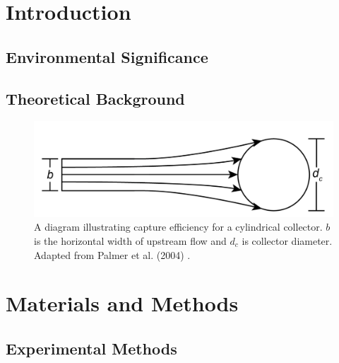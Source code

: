 \documentclass[geosciences,article,submit,moreauthors,pdftex]{Definitions/mdpi}
\begin{document}
\section{Introduction}

\subsection{Environmental Significance}

\subsection{Theoretical Background}

\begin{figure}[H]
\includegraphics[width=5in]{../pics/collectorefficiency.png}
\centering
\caption{A diagram illustrating capture efficiency for a cylindrical collector. $b$ is the horizontal width of upstream flow and $d_c$ is collector diameter. Adapted from Palmer et al. (2004) \cite{Palmer_2004}.}
\label{fig:capeff}
\end{figure}

\section{Materials and Methods}

\subsection{Experimental Methods}
\end{document}
